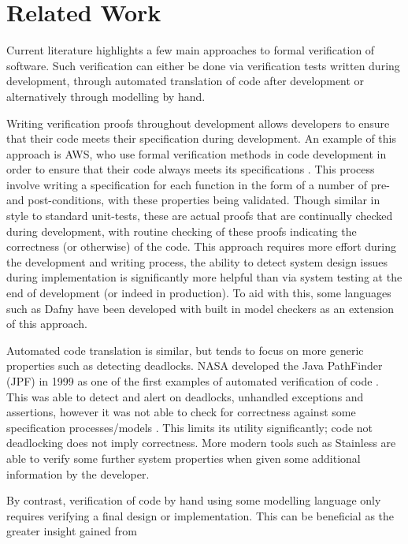 \section{Related Work}



Current literature highlights a few main approaches to formal verification of software. Such verification can either be done via verification tests written during development, through automated translation of code after development or alternatively through modelling by hand.

Writing verification proofs throughout development allows developers to ensure that their code meets their specification during development.
An example of this approach is AWS, who use formal verification methods in code development in order to ensure that their code always meets its specifications \cite{Amazon1,Amazon2}. This process involve writing a specification for each function in the form of a number of pre- and post-conditions, with these properties being validated. Though similar in style to standard unit-tests, these are actual proofs that are continually checked during development, with routine checking of these proofs indicating the correctness (or otherwise) of the code.
This approach requires more effort during the development and writing process, the ability to detect system design issues during implementation is significantly more helpful than via system testing at the end of development (or indeed in production). To aid with this, some languages such as Dafny\cite{Dafny} have been developed with built in model checkers as an extension of this approach.

Automated code translation is similar, but tends to focus on more generic properties such as detecting deadlocks. NASA developed the Java PathFinder (JPF) in 1999 as one of the first examples of automated verification of code \cite{NASA1}. This was able to detect and alert on deadlocks, unhandled exceptions and assertions, however it was not able to check for correctness against some specification processes/models \cite{NASA2}. This limits its utility significantly; code not deadlocking does not imply correctness. More modern tools such as Stainless are able to verify some further system properties when given some additional information by the developer\cite{C4DT}.


By contrast, verification of code by hand using some modelling language only requires verifying a final design or implementation. This can be beneficial as the greater insight gained from 

